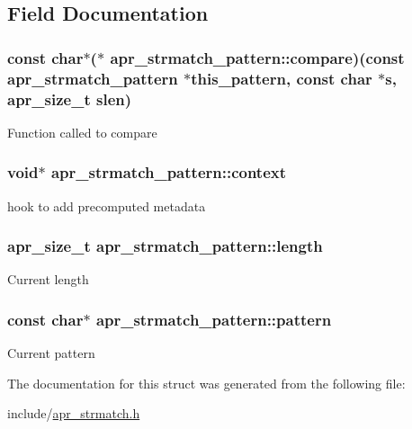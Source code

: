 \subsection{Field Documentation}
\hypertarget{structapr__strmatch__pattern_a722ba7f187cc179ac5fe0b306b8f9624}{
\subsubsection[{compare}]{\setlength{\rightskip}{0pt plus 5cm}const char$\ast$($\ast$ apr\-\_\-strmatch\-\_\-pattern\-::compare)(const {\bf apr\-\_\-strmatch\-\_\-pattern} $\ast$this\-\_\-pattern, const char $\ast$s, apr\-\_\-size\-\_\-t slen)}}\label{structapr__strmatch__pattern_a722ba7f187cc179ac5fe0b306b8f9624}
Function called to compare \hypertarget{structapr__strmatch__pattern_a0e74c401e8825e462e202175bf033a9c}{
\subsubsection[{context}]{\setlength{\rightskip}{0pt plus 5cm}void$\ast$ apr\-\_\-strmatch\-\_\-pattern\-::context}}\label{structapr__strmatch__pattern_a0e74c401e8825e462e202175bf033a9c}
hook to add precomputed metadata \hypertarget{structapr__strmatch__pattern_a4b1f44db089850f396bc4bedac0fb25c}{
\subsubsection[{length}]{\setlength{\rightskip}{0pt plus 5cm}apr\-\_\-size\-\_\-t apr\-\_\-strmatch\-\_\-pattern\-::length}}\label{structapr__strmatch__pattern_a4b1f44db089850f396bc4bedac0fb25c}
Current length \hypertarget{structapr__strmatch__pattern_ad219bd7708d7be5937cb79e7cfda01c0}{
\subsubsection[{pattern}]{\setlength{\rightskip}{0pt plus 5cm}const char$\ast$ apr\-\_\-strmatch\-\_\-pattern\-::pattern}}\label{structapr__strmatch__pattern_ad219bd7708d7be5937cb79e7cfda01c0}
Current pattern 

The documentation for this struct was generated from the following file\-:\begin{DoxyCompactItemize}
\item 
include/\hyperlink{apr__strmatch_8h}{apr\-\_\-strmatch.\-h}\end{DoxyCompactItemize}
